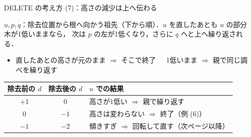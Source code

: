 \documentclass[aspectratio=169,11pt]{beamer}
\newcommand{\tri}[4]{%
  \draw ({#1},{#2}) -- ({#1-0.33},{#3}) -- ({#1+0.33},{#3}) -- cycle;
  \node[font=\scriptsize] at ({#1},{#3+0.6}) {$#4$};}
\begin{document}
\begin{frame}{DELETE の考え方 (7)：高さの減少は上へ伝わる}
  \raggedright\small
  $u,p,q$：除去位置から根へ向かう祖先（下から順）．$u$ を直したあとも $u$ の部分木が1低いままなら，
  次は $p$ の左が1低くなり，さらに $q$ へと\alert{上へ繰り返される}．
  \begin{itemize}
    \item 直したあとの高さが元のまま $\Rightarrow$ そこで\alert{終了}　\ 1低いまま $\Rightarrow$ 親で同じ調べを繰り返す
  \end{itemize}
  \footnotesize
  \begin{center}
    \renewcommand{\arraystretch}{1.1}
    \begin{tabular}{c|c|l}
      除去前の $d$ & 除去後の $d$ & $u$ での結果 \\\hline
      $+1$ & $0$ & 高さが1低い $\Rightarrow$ 親で繰り返す \\
      $0$ & $-1$ & 高さは変わらない $\Rightarrow$ 終了（例 (6)） \\
      $-1$ & $-2$ & 傾きすぎ $\Rightarrow$ 回転して直す（次ページ以降）
    \end{tabular}
  \end{center}
\end{frame}

\newcommand{\deletebefore}{%
    \node[nd,bal=R] (u) at (0,0) {$u$};
    \node[hl] (v) at (-1,-1) {$v$};
    \draw (u)--(v);
    \tri{-1}{-1.48}{-3}{\alpha}
    \draw[dashed] (-1.4,-5) -- (1.9,-5);
    \draw[{Stealth[length=1.6mm]}-{Stealth[length=1.6mm]}] (-1.25,-3) -- (-1.25,-5)
      node[midway,left,font=\scriptsize] {2};
    \node[font=\scriptsize,accent,align=right,left] at (-1.35,-0.6) {高さが\\1減少};}
\end{document}
